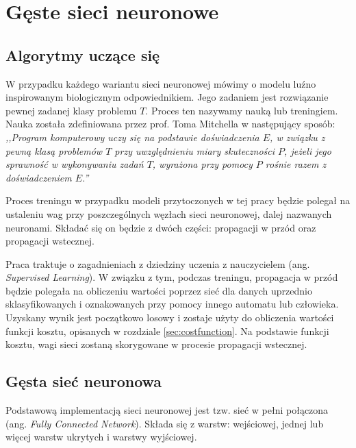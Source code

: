 \chapter{Gęste sieci neuronowe}
\label{chap:siecifc}

\section{Algorytmy uczące się}

W przypadku każdego wariantu sieci neuronowej mówimy o modelu luźno inspirowanym biologicznym odpowiednikiem. Jego zadaniem jest rozwiązanie pewnej zadanej klasy problemu \(T\). Proces ten nazywamy nauką lub treningiem. Nauka została zdefiniowana przez prof. Toma Mitchella w następujący sposób:
\textit{,,Program komputerowy uczy się na podstawie doświadczenia \(E\), w związku z pewną klasą problemów \(T\) przy uwzględnieniu miary skuteczności \(P\), jeżeli jego sprawność w wykonywaniu zadań \(T\), wyrażona przy pomocy \(P\)
rośnie razem z doświadczeniem \(E\).''}

Proces treningu w przypadku modeli przytoczonych w tej pracy będzie polegał na ustaleniu wag przy poszczególnych węzłach sieci neuronowej, dalej nazwanych neuronami. Składać się on będzie z dwóch części: propagacji w przód oraz propagacji wstecznej. 

Praca traktuje o zagadnieniach z dziedziny uczenia z nauczycielem (ang. \textit{Supervised Learning}). W związku z tym, podczas treningu, propagacja w przód będzie polegała na obliczeniu wartości poprzez sieć dla danych uprzednio sklasyfikowanych i oznakowanych przy pomocy innego automatu lub człowieka.
Uzyskany wynik jest początkowo losowy i zostaje użyty do obliczenia wartości funkcji kosztu, opisanych w rozdziale \ref{sec:costfunction}.
Na podstawie funkcji kosztu, wagi sieci zostaną skorygowane w procesie propagacji wstecznej.

\section{Gęsta sieć neuronowa}

Podstawową implementacją sieci neuronowej jest tzw. sieć w pełni połączona (ang. \textit{Fully Connected Network}). Składa się z warstw: wejściowej, jednej lub więcej warstw ukrytych i warstwy wyjściowej.  

